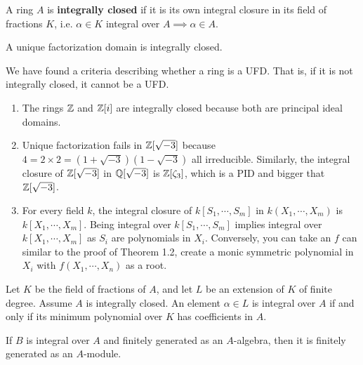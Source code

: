 \documentclass[12pt]{amsart}
\begin{document}
\begin{definition}
    A ring $A$ is \textbf{integrally closed} if it is its own integral closure in its field of fractions $K$, i.e. $\alpha \in K$ integral over $A \implies \alpha \in A$. 
\end{definition}

\begin{proposition}
    A unique factorization domain is integrally closed. 
\end{proposition}


\begin{remark}
    We have found a criteria describing whether a ring is a UFD. That is, if it is not integrally closed, it cannot be a UFD.
\end{remark} 

\begin{example} \bbni
    \begin{enumerate}
        \item The rings $\mathbb Z$ and $\mathbb Z[i]$ are integrally closed because both are principal ideal domains.
        \item Unique factorization fails in $\mathbb Z[\sqrt{-3}]$ because $4 = 2 \times 2 = (1+\sqrt{-3})(1-\sqrt{-3})$ all irreducible. Similarly, the integral closure of $\mathbb Z[\sqrt{-3}]$ in $\mathbb Q[\sqrt{-3}]$ is $\mathbb Z[\zeta_3]$, which is a PID and bigger that $\mathbb Z[\sqrt{-3}]$. 
        \item For every field $k$, the integral closure of $k[S_1, \cdots, S_m]$ in $k(X_1, \cdots, X_m)$ is $k[X_1, \cdots, X_m]$. Being integral over $k[S_1, \cdots, S_m]$ implies integral over $k[X_1, \cdots, X_m]$ as $S_i$ are polynomials in $X_i$. Conversely, you can take an $f$ can similar to the proof of Theorem 1.2, create a monic symmetric polynomial in $X_i$ with $f(X_1, \cdots, X_n)$ as a root.
    \end{enumerate}
\end{example}

\begin{proposition}
    Let $K$ be the field of fractions of $A$, and let $L$ be an extension of $K$ of finite degree. Assume $A$ is integrally closed. An element $\alpha \in L$ is integral over $A$ if and only if its minimum polynomial over $K$ has coefficients in $A$. 
\end{proposition}


\begin{proposition}
    If $B$ is integral over $A$ and finitely generated as an $A$-algebra, then it is finitely generated as an $A$-module. 
\end{proposition}
\end{document}
